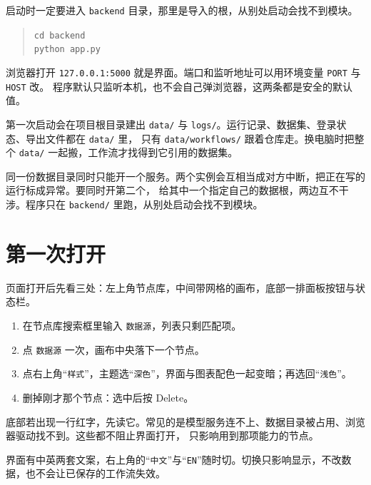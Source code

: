 \documentclass[a4paper]{article}
\begin{document}
启动时一定要进入 \texttt{backend} 目录，那里是导入的根，从别处启动会找不到模块。

\begin{quote}\small
\texttt{cd backend}\\
\texttt{python app.py}
\end{quote}

浏览器打开 \texttt{127.0.0.1:5000} 就是界面。端口和监听地址可以用环境变量 \texttt{PORT} 与 \texttt{HOST} 改。
程序默认只监听本机，也不会自己弹浏览器，这两条都是安全的默认值。

第一次启动会在项目根目录建出 \texttt{data/} 与 \texttt{logs/}。运行记录、数据集、登录状态、导出文件都在 \texttt{data/} 里，
只有 \texttt{data/workflows/} 跟着仓库走。换电脑时把整个 \texttt{data/} 一起搬，工作流才找得到它引用的数据集。

同一份数据目录同时只能开一个服务。两个实例会互相当成对方中断，把正在写的运行标成异常。要同时开第二个，
给其中一个指定自己的数据根，两边互不干涉。程序只在 \texttt{backend/} 里跑，从别处启动会找不到模块。

\section{第一次打开}

页面打开后先看三处：左上角节点库，中间带网格的画布，底部一排面板按钮与状态栏。

\begin{enumerate}
\item 在节点库搜索框里输入 \texttt{数据源}，列表只剩匹配项。
\item 点 \texttt{数据源} 一次，画布中央落下一个节点。
\item 点右上角“\texttt{样式}”，主题选“\texttt{深色}”，界面与图表配色一起变暗；再选回“\texttt{浅色}”。
\item 删掉刚才那个节点：选中后按 Delete。
\end{enumerate}

底部若出现一行红字，先读它。常见的是模型服务连不上、数据目录被占用、浏览器驱动找不到。这些都不阻止界面打开，
只影响用到那项能力的节点。

界面有中英两套文案，右上角的“\texttt{中文}”与“\texttt{EN}”随时切。切换只影响显示，不改数据，也不会让已保存的工作流失效。












\end{document}
